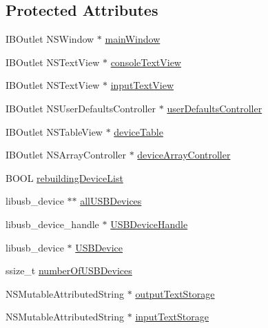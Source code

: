 \subsection*{Protected Attributes}
\begin{DoxyCompactItemize}
\item 
I\-B\-Outlet N\-S\-Window $\ast$ \hyperlink{interface_c_t_app_delegate_a0e5d80a8d3d78945c2b14d477a71c0eb}{main\-Window}
\item 
I\-B\-Outlet N\-S\-Text\-View $\ast$ \hyperlink{interface_c_t_app_delegate_a02680c24bf116eb7869cfe0489b2a381}{console\-Text\-View}
\item 
I\-B\-Outlet N\-S\-Text\-View $\ast$ \hyperlink{interface_c_t_app_delegate_abf8e0f79b36a4b23262ba2a2d29eabe7}{input\-Text\-View}
\item 
I\-B\-Outlet N\-S\-User\-Defaults\-Controller $\ast$ \hyperlink{interface_c_t_app_delegate_a55373d5265a108cb12510bd086aa15e8}{user\-Defaults\-Controller}
\item 
I\-B\-Outlet N\-S\-Table\-View $\ast$ \hyperlink{interface_c_t_app_delegate_aa9da52eef008be58cd46240bd866fc4e}{device\-Table}
\item 
I\-B\-Outlet N\-S\-Array\-Controller $\ast$ \hyperlink{interface_c_t_app_delegate_a39b7c3b8cf871476b88dbd4bcd75c375}{device\-Array\-Controller}
\item 
B\-O\-O\-L \hyperlink{interface_c_t_app_delegate_a1b55e71f0fcf89b448e51efd5ecd0915}{rebuilding\-Device\-List}
\item 
libusb\-\_\-device $\ast$$\ast$ \hyperlink{interface_c_t_app_delegate_a9d80eb0a8fb6f9c373648cba3dbe5b26}{all\-U\-S\-B\-Devices}
\item 
libusb\-\_\-device\-\_\-handle $\ast$ \hyperlink{interface_c_t_app_delegate_a0efa5af44bc03361f0953b7946461635}{U\-S\-B\-Device\-Handle}
\item 
libusb\-\_\-device $\ast$ \hyperlink{interface_c_t_app_delegate_a98b42a4c60f53c6a31c1554bec3bd9bb}{U\-S\-B\-Device}
\item 
ssize\-\_\-t \hyperlink{interface_c_t_app_delegate_aab4901a3d0ce6c86771365bbf1645eeb}{number\-Of\-U\-S\-B\-Devices}
\item 
N\-S\-Mutable\-Attributed\-String $\ast$ \hyperlink{interface_c_t_app_delegate_a46c927de3b01529297fa0e078e486f19}{output\-Text\-Storage}
\item 
N\-S\-Mutable\-Attributed\-String $\ast$ \hyperlink{interface_c_t_app_delegate_a267286c82789444b42d30238c62b38bc}{input\-Text\-Storage}
\end{DoxyCompactItemize}
